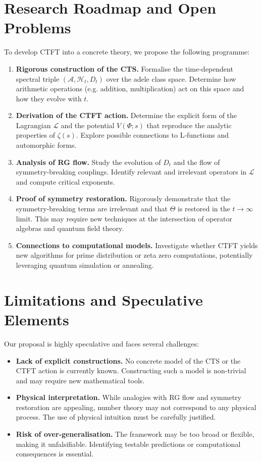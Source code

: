 \documentclass[11pt, a4paper]{article}
\theoremstyle{definition}
\newcommand{\Lagr}{\mathcal{L}}
\newcommand{\Hilb}{\mathcal{H}}
\newcommand{\Alg}{\mathscr{A}}
\begin{document}
\section{Research Roadmap and Open Problems}

To develop CTFT into a concrete theory, we propose the following programme:

\begin{enumerate}
    \item \textbf{Rigorous construction of the CTS.}  Formalise the time‑dependent spectral triple $(\Alg, \Hilb_t, D_t)$ over the adele class space.  Determine how arithmetic operations (e.g. addition, multiplication) act on this space and how they evolve with $t$.
    \item \textbf{Derivation of the CTFT action.}  Determine the explicit form of the Lagrangian $\Lagr$ and the potential $V(\Phi; s)$ that reproduce the analytic properties of $\zeta(s)$.  Explore possible connections to L‑functions and automorphic forms.
    \item \textbf{Analysis of RG flow.}  Study the evolution of $D_t$ and the flow of symmetry‑breaking couplings.  Identify relevant and irrelevant operators in $\Lagr$ and compute critical exponents.
    \item \textbf{Proof of symmetry restoration.}  Rigorously demonstrate that the symmetry‑breaking terms are irrelevant and that $\Theta$ is restored in the $t\to\infty$ limit.  This may require new techniques at the intersection of operator algebras and quantum field theory.
    \item \textbf{Connections to computational models.}  Investigate whether CTFT yields new algorithms for prime distribution or zeta zero computations, potentially leveraging quantum simulation or annealing.
\end{enumerate}

\section{Limitations and Speculative Elements}

Our proposal is highly speculative and faces several challenges:

\begin{itemize}
    \item \textbf{Lack of explicit constructions.}  No concrete model of the CTS or the CTFT action is currently known.  Constructing such a model is non‑trivial and may require new mathematical tools.
    \item \textbf{Physical interpretation.}  While analogies with RG flow and symmetry restoration are appealing, number theory may not correspond to any physical process.  The use of physical intuition must be carefully justified.
    \item \textbf{Risk of over‑generalisation.}  The framework may be too broad or flexible, making it unfalsifiable.  Identifying testable predictions or computational consequences is essential.
\end{itemize}
\end{document}
